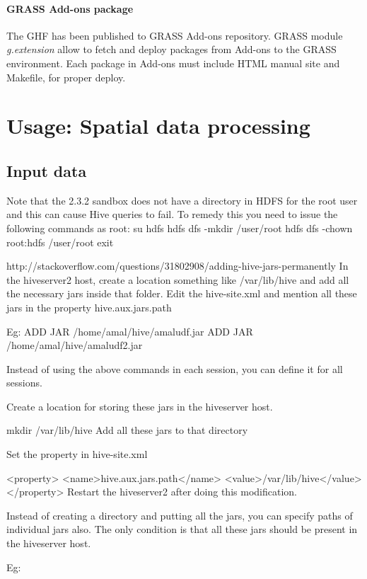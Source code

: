 \documentclass[a4paper,12pt,oneside]{report}
\begin{document}
\paragraph{GRASS Add-ons package} The GHF has been published to GRASS Add-ons repository. GRASS module \textit{g.extension} allow to fetch and deploy packages from Add-ons to the GRASS environment. Each package in Add-ons must include HTML manual site and Makefile, for proper deploy. 



\section{Usage: Spatial data processing}\label{sec:usage_spatial}
	\subsection{Input data}

	
	Note that the 2.3.2 sandbox does not have a directory in HDFS for the root user and this can cause Hive queries to fail. To remedy this you need to issue the following commands as root:
su hdfs
hdfs dfs -mkdir /user/root
hdfs dfs -chown root:hdfs /user/root
exit
	



http://stackoverflow.com/questions/31802908/adding-hive-jars-permanently
In the hiveserver2 host, create a location something like /var/lib/hive and add all the necessary jars inside that folder. Edit the hive-site.xml and mention all these jars in the property hive.aux.jars.path

Eg: ADD JAR /home/amal/hive/amaludf.jar ADD JAR /home/amal/hive/amaludf2.jar

Instead of using the above commands in each session, you can define it for all sessions.

Create a location for storing these jars in the hiveserver host.

mkdir /var/lib/hive
Add all these jars to that directory

Set the property in hive-site.xml

<property>
  <name>hive.aux.jars.path</name>
  <value>/var/lib/hive</value>
</property>
Restart the hiveserver2 after doing this modification.

Instead of creating a directory and putting all the jars, you can specify paths of individual jars also. The only condition is that all these jars should be present in the hiveserver host.

Eg:
\end{document}
